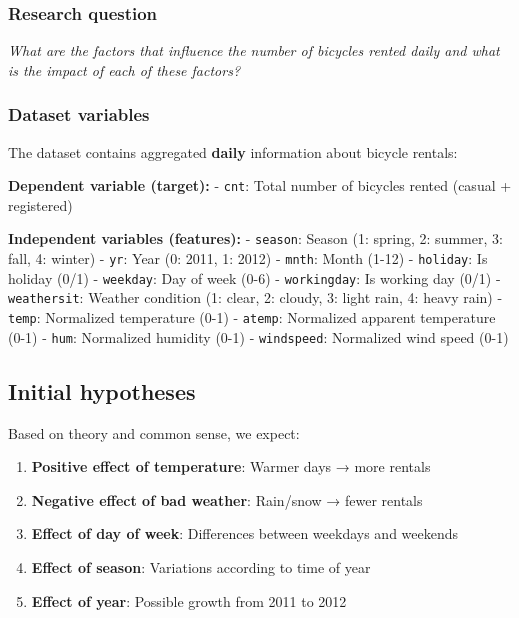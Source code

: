 \documentclass[
]{article}
\providecommand{\tightlist}{%
  \setlength{\itemsep}{0pt}\setlength{\parskip}{0pt}}
\begin{document}
\subsubsection{Research question}\label{research-question}

\emph{What are the factors that influence the number of bicycles rented
daily and what is the impact of each of these factors?}

\subsubsection{Dataset variables}\label{dataset-variables}

The dataset contains aggregated \textbf{daily} information about bicycle
rentals:

\textbf{Dependent variable (target):} - \texttt{cnt}: Total number of
bicycles rented (casual + registered)

\textbf{Independent variables (features):} - \texttt{season}: Season (1:
spring, 2: summer, 3: fall, 4: winter) - \texttt{yr}: Year (0: 2011, 1:
2012) - \texttt{mnth}: Month (1-12) - \texttt{holiday}: Is holiday (0/1)
- \texttt{weekday}: Day of week (0-6) - \texttt{workingday}: Is working
day (0/1) - \texttt{weathersit}: Weather condition (1: clear, 2: cloudy,
3: light rain, 4: heavy rain) - \texttt{temp}: Normalized temperature
(0-1) - \texttt{atemp}: Normalized apparent temperature (0-1) -
\texttt{hum}: Normalized humidity (0-1) - \texttt{windspeed}: Normalized
wind speed (0-1)

\subsection{Initial hypotheses}\label{initial-hypotheses}

Based on theory and common sense, we expect:

\begin{enumerate}
\def\labelenumi{\arabic{enumi}.}
\tightlist
\item
  \textbf{Positive effect of temperature}: Warmer days → more rentals
\item
  \textbf{Negative effect of bad weather}: Rain/snow → fewer rentals
\item
  \textbf{Effect of day of week}: Differences between weekdays and
  weekends
\item
  \textbf{Effect of season}: Variations according to time of year
\item
  \textbf{Effect of year}: Possible growth from 2011 to 2012
\end{enumerate}
\end{document}
